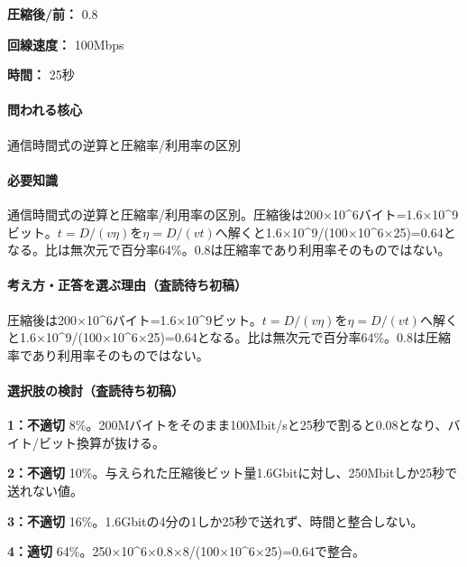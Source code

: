\noindent\textbf{圧縮後/前：} 0.8\par

\noindent\textbf{回線速度：} 100Mbps\par

\noindent\textbf{時間：} 25秒\par

\paragraph{問われる核心} 通信時間式の逆算と圧縮率/利用率の区別

\paragraph{必要知識} 通信時間式の逆算と圧縮率/利用率の区別。圧縮後は200×10\textasciicircum{}6バイト=1.6×10\textasciicircum{}9ビット。\(t=D/(v\eta)\)を\(\eta=D/(vt)\)へ解くと1.6×10\textasciicircum{}9/(100×10\textasciicircum{}6×25)=\allowbreak{}0.64となる。比は無次元で百分率64\%。0.8は圧縮率であり利用率そのものではない。

\paragraph{考え方・正答を選ぶ理由（査読待ち初稿）} 圧縮後は200×10\textasciicircum{}6バイト=1.6×10\textasciicircum{}9ビット。\(t=D/(v\eta)\)を\(\eta=D/(vt)\)へ解くと1.6×10\textasciicircum{}9/(100×10\textasciicircum{}6×25)=\allowbreak{}0.64となる。比は無次元で百分率64\%。0.8は圧縮率であり利用率そのものではない。

\paragraph{選択肢の検討（査読待ち初稿）}\mbox{}\par

\noindent\textbf{1：不適切} 8\%。200Mバイトをそのまま100Mbit/sと25秒で割ると0.08となり、バイト/ビット換算が抜ける。\par

\noindent\textbf{2：不適切} 10\%。与えられた圧縮後ビット量1.6Gbitに対し、250Mbitしか25秒で送れない値。\par

\noindent\textbf{3：不適切} 16\%。1.6Gbitの4分の1しか25秒で送れず、時間と整合しない。\par

\noindent\textbf{4：適切} 64\%。250×10\textasciicircum{}6×0.8×8/(100×10\textasciicircum{}6×25)=\allowbreak{}0.64で整合。\par

